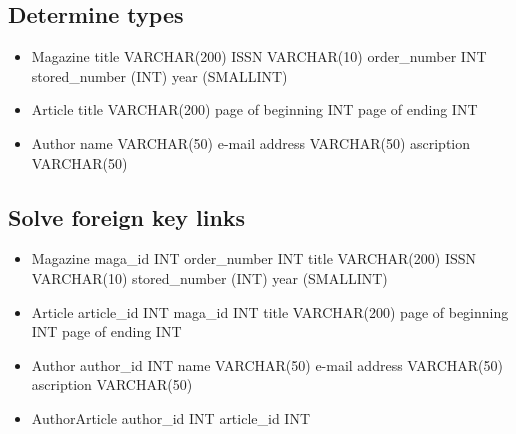 \documentclass{article}
\begin{document}
\subsection{Determine types}
\begin{itemize}
    \item Magazine
    \subitem title VARCHAR(200)
    \subitem ISSN VARCHAR(10)
    \subitem order\_number INT 
    \subitem stored\_number (INT)
    \subitem year (SMALLINT)
    
    \item Article
    \subitem title VARCHAR(200)
    \subitem page of beginning INT 
    \subitem page of ending INT
    
    \item Author
    \subitem name VARCHAR(50)
    \subitem e-mail address VARCHAR(50)
    \subitem ascription VARCHAR(50)
    
\end{itemize}

\subsection{Solve foreign key links}
\begin{itemize}
    \item Magazine
    \subitem maga\_id INT 
    \subitem order\_number INT 
    \subitem title VARCHAR(200)
    \subitem ISSN VARCHAR(10)
    \subitem stored\_number (INT)
    \subitem year (SMALLINT)
    
    \item Article
    \subitem article\_id INT
    \subitem maga\_id INT
    \subitem title VARCHAR(200)
    \subitem page of beginning INT 
    \subitem page of ending INT
    
    \item Author
    \subitem author\_id INT
    \subitem name VARCHAR(50)
    \subitem e-mail address VARCHAR(50)
    \subitem ascription VARCHAR(50)

    
    \item AuthorArticle
    \subitem author\_id INT
    \subitem article\_id INT
\end{itemize}
\end{document}
